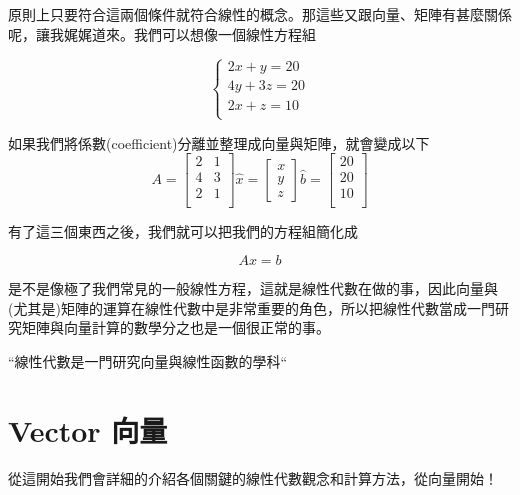 \documentclass[11pt]{article}
\begin{document}
原則上只要符合這兩個條件就符合線性的概念。那這些又跟向量、矩陣有甚麼關係呢，讓我娓娓道來。我們可以想像一個線性方程組

\[
\begin{cases}
2x + y = 20 \\
4y + 3z = 20 \\
2x + z = 10 \\
\end{cases}
\]

如果我們將係數(coefficient)分離並整理成向量與矩陣，就會變成以下
\[
A = \begin{bmatrix}
2 & 1 \\
4 & 3 \\
2 & 1 \\
\end{bmatrix}
\hat{x} = \begin{bmatrix}
x \\
y \\
z
\end{bmatrix}
\hat{b} = \begin{bmatrix}
20 \\
20 \\
10 \\
\end{bmatrix}
\]

有了這三個東西之後，我們就可以把我們的方程組簡化成

\[
Ax = b
\]

是不是像極了我們常見的一般線性方程，這就是線性代數在做的事，因此向量與(尤其是)矩陣的運算在線性代數中是非常重要的角色，所以把線性代數當成一門研究矩陣與向量計算的數學分之也是一個很正常的事。
\begin{center}
``線性代數是一門研究向量與線性函數的學科``
\end{center}

\section{Vector 向量}
從這開始我們會詳細的介紹各個關鍵的線性代數觀念和計算方法，從向量開始！
\end{document}
